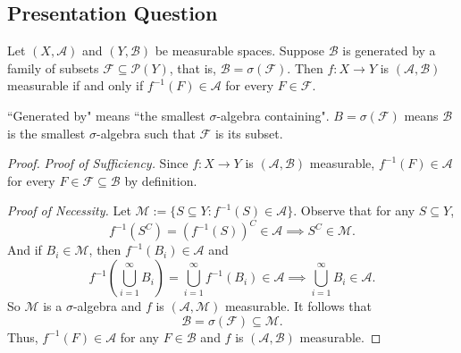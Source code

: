 \documentclass[class=book, crop=false]{standalone}
\begin{document}
        \subsection{Presentation Question}
        \begin{question}
            Let $(X, \mathcal{A})$ and $(Y, \mathcal{B})$ be measurable spaces. Suppose $\mathcal{B}$ is generated by a family of subsets $\mathscr{F} \subseteq \mathscr{P}(Y)$, that is, $\mathcal{B} = \sigma(\mathscr{F})$. Then $f: X \rightarrow Y$ is $(\mathcal{A}, \mathcal{B})$ measurable if and only if $f^{-1}(F) \in \mathcal{A}$ for every $F \in \mathscr{F}$.
        \end{question}
        \begin{remark}
            ``Generated by" means ``the smallest $\sigma$-algebra containing". $B = \sigma(\mathscr{F})$ means $\mathcal{B}$ is the smallest $\sigma$-algebra such that $\mathscr{F}$ is its subset.
        \end{remark}
        \begin{proof}
            \textit{Proof of Sufficiency.} Since $f : X \rightarrow Y$ is $(\mathcal{A}, \mathcal{B})$ measurable, $f^{-1}(F) \in \mathcal{A}$ for every $F \in \mathscr{F} \subseteq \mathcal{B}$ by definition.
    
            \noindent \textit{Proof of Necessity.} Let $\mathcal{M} := \{S \subseteq Y : f^{-1}(S) \in \mathcal{A}\}$. Observe that for any $S \subseteq Y$,
            \begin{equation*}
                f^{-1}(S^C) = (f^{-1}(S))^{C} \in \mathcal{A} \implies S^C \in \mathcal{M}. 
            \end{equation*}
            And if $B_i \in \mathcal{M}$, then $f^{-1}(B_i) \in \mathcal{A}$ and
            \begin{equation*}
                f^{-1}\left(\bigcup^{\infty}_{i = 1} B_i\right) = \bigcup^{\infty}_{i = 1} f^{-1}(B_i) \in \mathcal{A} \implies \bigcup^{\infty}_{i = 1} B_i \in \mathcal{A}.
            \end{equation*}
            So $\mathcal{M}$ is a $\sigma$-algebra and $f$ is $(\mathcal{A}, \mathcal{M})$ measurable. It follows that
            \begin{equation*}
                \mathcal{B} = \sigma(\mathscr{F}) \subseteq \mathcal{M}.
            \end{equation*}
            Thus, $f^{-1}(F) \in \mathcal{A}$ for any $F \in \mathcal{B}$ and $f$ is $(\mathcal{A}, \mathcal{B})$ measurable.
        \end{proof}
\end{document}
